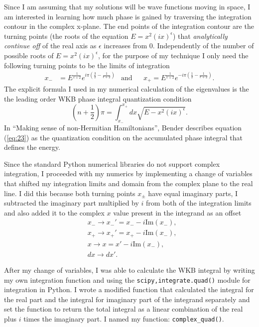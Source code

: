 \documentclass[10pt, a4paper, singlespacing]{report}
\begin{document}
Since I am assuming that my solutions will be wave functions moving in space, I am interested in learning how much phase is gained by traversing the integration contour in the complex x-plane. The end points of the integration contour are the turning points (the roots of the equation $E = x^2(ix)^{\epsilon}$) that \emph{analytically continue off} of the real axis as $\epsilon$ increases from $0$\cite{BenderPT}\cite{Bender}. Independently of the number of possible roots of $E = x^2(ix)^{\epsilon}$, for the purpose of my technique I only need the following turning points to be the limits of integration
\begin{align} \label{eq:22}
x_{-}& = 
E^{\frac{1}{\epsilon + 2}}
e^{i\pi(\frac{3}{2} - \frac{1}{\epsilon + 2})}
&\mathrm{and}&
&x_{+} = E^{\frac{1}{\epsilon + 2}} e^{-i\pi(\frac{1}{2} - \frac{1}{\epsilon + 2})}.
\end{align}
The explicit formula I used in my numerical calculation of the eigenvalues is the the leading order WKB phase integral quantization condition 
\begin{equation} \label{eq:23}
\left (n +\frac{1}{2}\right )\pi = \int^{x_{+}}_{x_{-}}dx \sqrt{E - x^2(ix)^{\epsilon}}.
\end{equation}
In ``Making sense of non-Hermitian Hamiltonians'', Bender describes equation (\ref{eq:23}) as the quantization condition on the accumulated phase integral that defines the energy.

Since the standard Python numerical libraries do not support complex integration, I proceeded with my numerics by implementing a change of variables that shifted my integration limits and domain from the complex plane to the real line. I did this because both turning points $x_{\pm}$ have equal imaginary parts, I subtracted the imaginary part multiplied by $i$ from both of the integration limits and also added it to the complex $x$ value present in the integrand as an offset
\begin{equation} \label{eq:24}
\begin{split}
&x_{-}\rightarrow x_{-}' = x_{-} - i \mathrm{Im}(x_{-}),\\
&x_{+}\rightarrow x_{+}' = x_{+} - i \mathrm{Im}(x_{-}),\\
&x\rightarrow x = x' - i \mathrm{Im}(x_{-}),\\
&dx\rightarrow dx'.
\end{split}
\end{equation}

After my change of variables, I was able to calculate the WKB integral by writing my own integration function and using the \texttt{scipy,integrate.quad()} module for integration in Python. I wrote a modified function that calculated the integral for the real part and the integral for imaginary part of the integrand separately and set the function to return the total integral as a linear combination of the real plus $i$ times the imaginary part. I named my function: \texttt{complex\_quad()}.
\end{document}
